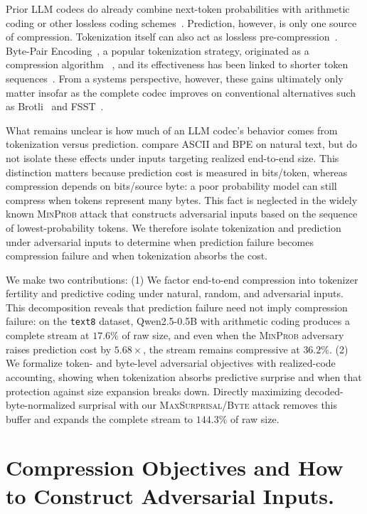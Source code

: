 \documentclass{article}
\newcommand{\sparagraph}[1]{\vspace{1mm}\noindent {\bf #1}}
\newcommand{\MinProb}[0]{\textsc{MinProb}}
\newcommand{\MaxSurprisal}[0]{\textsc{MaxSurprisal/Byte}}
\begin{document}
Prior LLM codecs do already combine next-token probabilities with arithmetic coding or other lossless coding schemes~\citep{valmeekam2023llmzip}. Prediction, however, is only one source of compression. Tokenization itself can also act as lossless pre-compression~\citep{deletang2024language}. Byte-Pair Encoding~\citep{sennrich2016bpe}, a popular tokenization strategy, originated as a compression algorithm ~\citep{gage1994new}, and its effectiveness has been linked to shorter token sequences~\citep{galle2019investigating}. From a systems perspective, however, these gains ultimately only matter insofar as the complete codec improves on conventional alternatives such as Brotli~\citep{alakuijala2016brotli} and FSST~\citep{boncz2020fsst}.

What remains unclear is how much of an LLM codec's behavior comes from tokenization versus prediction. \citet{deletang2024language} compare ASCII and BPE on natural text, but do not isolate these effects under inputs targeting realized end-to-end size. This distinction matters because prediction cost is measured in bits/token, whereas compression depends on bits/source byte: a poor probability model can still compress when tokens represent many bytes.
This fact is neglected in the widely known \MinProb{} attack that constructs adversarial inputs based on the sequence of lowest-probability tokens.
We therefore isolate tokenization and prediction under adversarial inputs to determine when prediction failure becomes compression failure and when tokenization absorbs the cost.

\sparagraph{Contributions.} We make two contributions: (1) We factor end-to-end compression into tokenizer fertility and predictive coding under natural, random, and adversarial inputs. This decomposition reveals that prediction failure need not imply compression failure: on the \texttt{text8} dataset, Qwen2.5-0.5B with arithmetic coding produces a complete stream at $17.6\%$ of raw size, and even when the \MinProb{} adversary raises prediction cost by $5.68\times$, the stream remains compressive at $36.2\%$. (2) We formalize token- and byte-level adversarial objectives with realized-code accounting, showing when tokenization absorbs predictive surprise and when that protection against size expansion breaks down. Directly maximizing decoded-byte-normalized surprisal with our \MaxSurprisal{} attack removes this buffer and expands the complete stream to $144.3\%$ of raw size.


\section{Compression Objectives and How to Construct Adversarial Inputs.}
\label{sec:attacks}
\end{document}
